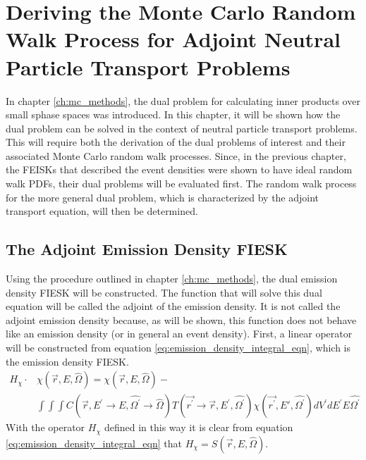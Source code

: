 \chapter{Deriving the Monte Carlo Random Walk Process for Adjoint Neutral Particle Transport Problems}
\label{ch:adjoint_neutral_particle_transport}
In chapter \ref{ch:mc_methods}, the dual problem for calculating inner products
over small sphase spaces was introduced. In this chapter, it will be shown how
the dual problem can be solved in the context of neutral particle transport 
problems. This will require both the derivation of the dual problems of interest
and their associated Monte Carlo random walk processes. Since, in the previous
chapter, the FEISKs that described the event densities were shown to have 
ideal random walk PDFs, their dual problems will be evaluated first. The 
random walk process for the more general dual problem, which is characterized
by the adjoint transport equation, will then be determined. 

\section{The Adjoint Emission Density FIESK}
Using the procedure outlined in chapter \ref{ch:mc_methods}, the dual emission
density FIESK will be constructed. The function that will solve this dual 
equation will be called the adjoint of the emission density. It is not called
the adjoint emission density because, as will be shown, this function does
not behave like an emission density (or in general an event density). First, 
a linear operator will be constructed from equation 
\ref{eq:emission_density_integral_eqn}, which is the emission density FIESK. 
\begin{equation}
  \begin{split}
    H_{\chi} \cdot &\chi(\vec{r},E,\hat{\Omega}) = 
    \chi(\vec{r},E,\hat{\Omega}) - \\
    & \int\int\int C(\vec{r},E^{'} \to E,\hat{\Omega^{'}} \to \hat{\Omega})
    T(\vec{r^{'}} \to \vec{r},E^{'},\hat{\Omega^{'}}) 
    \chi(\vec{r^{'}},E',\hat{\Omega^{'}}) dV^{'}dE^{'}E\hat{\Omega^{'}}
  \end{split}
\end{equation}
With the operator $H_{\chi}$ defined in this way it is clear from equation
\ref{eq:emission_density_integral_eqn} that 
$H_{\chi} = S(\vec{r},E,\hat{\Omega})$.

